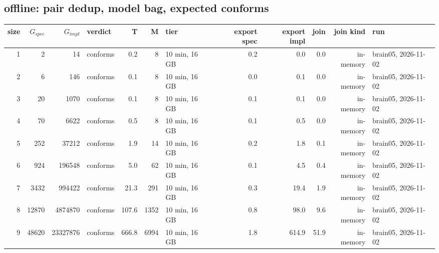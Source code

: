 \documentclass[10pt]{article}
\begin{document}
\subsection*{offline: pair \textsf{dedup}, model bag, expected conforms}
\begin{longtable}{@{}rrrlrrlrrrrl@{}}
\toprule
size & $G_{\mathit{spec}}$ & $G_{\mathit{impl}}$ & verdict & T & M & tier & export spec & export impl & join & join kind & run \\
\midrule
\endhead
\color{red} 1 & 2 & 14 & conforms & 0.2 & 8 & 10 min, 16 GB & 0.2 & 0.0 & 0.0 & in-memory & brain05, 2026-11-02 \\
\color{red} 2 & 6 & 146 & conforms & 0.1 & 8 & 10 min, 16 GB & 0.0 & 0.1 & 0.0 & in-memory & brain05, 2026-11-02 \\
\color{red} 3 & 20 & 1070 & conforms & 0.1 & 8 & 10 min, 16 GB & 0.1 & 0.1 & 0.0 & in-memory & brain05, 2026-11-02 \\
\color{red} 4 & 70 & 6622 & conforms & 0.5 & 8 & 10 min, 16 GB & 0.1 & 0.5 & 0.0 & in-memory & brain05, 2026-11-02 \\
\color{red} 5 & 252 & 37212 & conforms & 1.9 & 14 & 10 min, 16 GB & 0.2 & 1.8 & 0.1 & in-memory & brain05, 2026-11-02 \\
\color{red} 6 & 924 & 196548 & conforms & 5.0 & 62 & 10 min, 16 GB & 0.1 & 4.5 & 0.4 & in-memory & brain05, 2026-11-02 \\
\color{red} 7 & 3432 & 994422 & conforms & 21.3 & 291 & 10 min, 16 GB & 0.3 & 19.4 & 1.9 & in-memory & brain05, 2026-11-02 \\
\color{red} 8 & 12870 & 4874870 & conforms & 107.6 & 1352 & 10 min, 16 GB & 0.8 & 98.0 & 9.6 & in-memory & brain05, 2026-11-02 \\
\color{red} 9 & 48620 & 23327876 & conforms & 666.8 & 6994 & 10 min, 16 GB & 1.8 & 614.9 & 51.9 & in-memory & brain05, 2026-11-02 \\
\bottomrule
\end{longtable}
\end{document}
